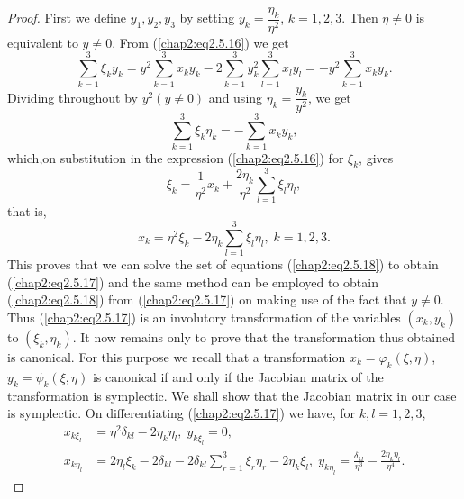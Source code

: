 \begin{proof}
First we define $y_1, y_2, y_3$ by setting $y_k = \dfrac{\eta_k}{\eta^2}$, $k = 1,2,3$. Then $\eta \neq 0$ is equivalent to $y \neq 0$. From (\ref{chap2:eq2.5.16}) we get
$$
\sum\limits^3_{k=1} \xi_k y_k = y^2 \sum\limits^3_{k=1} x_k y_k - 2 \sum\limits^3_{k=1} y^2_k\sum\limits^3_{l=1} x_l y_l = - y^2 \sum\limits^3_{k=1} x_k y_k. 
$$
Dividing throughout by $y^2 (y \neq 0)$ and using $\eta_k = \dfrac{y_k}{y^2}$, we get 
$$
\sum\limits^3_{k=1} \xi_k \eta_k = - \sum\limits^3_{k=1} x_k y_k,
$$
which,\pageoriginale on substitution in the expression (\ref{chap2:eq2.5.16}) for $\xi_k$, gives
$$
\xi_k = \frac{1}{\eta^2} x_k + \frac{2\eta_k}{\eta^2} \sum\limits^3_{l=1} \xi_l \eta_l,
$$
that is, 
$$
x_k = \eta^2 \xi_k - 2 \eta_k \sum\limits^3_{l=1} \xi_l \eta_l, \; k =1,2,3. 
$$
This proves that we can solve the set of equations (\ref{chap2:eq2.5.18}) to obtain (\ref{chap2:eq2.5.17}) and the same method can be employed to obtain (\ref{chap2:eq2.5.18}) from (\ref{chap2:eq2.5.17}) on making use of the fact that $y \neq 0$. Thus (\ref{chap2:eq2.5.17}) is an involutory transformation of the variables $(x_k, y_k)$ to $(\xi_k , \eta_k)$. It now remains only to prove that the transformation thus obtained is canonical. For this purpose we recall that a transformation $x_k =  \varphi_k (\xi, \eta)$, $y_k = \psi_k(\xi, \eta)$ is canonical if and only if the Jacobian matrix of the transformation is symplectic. We shall show that the Jacobian matrix in our case is symplectic. On differentiating (\ref{chap2:eq2.5.17}) we have, for $k, l=1,2,3$,
\begin{align*}
x_{k \xi_l} & = \eta^2 \delta_{kl} - 2 \eta_k \eta_l, \; y_{k \xi_l} = 0,\\
x_{k \eta_l} & = 2 \eta_l \xi_k - 2 \delta_{kl} - 2 \delta_{kl} \sum\limits^3_{r=1} \xi_r \eta_r - 2 \eta_k\xi_l, \; y_{k \eta_l} =\frac{\delta_{kl}}{\eta^3} - \frac{2\eta_k \eta_l}{\eta^4}.
\end{align*}

\end{proof}
